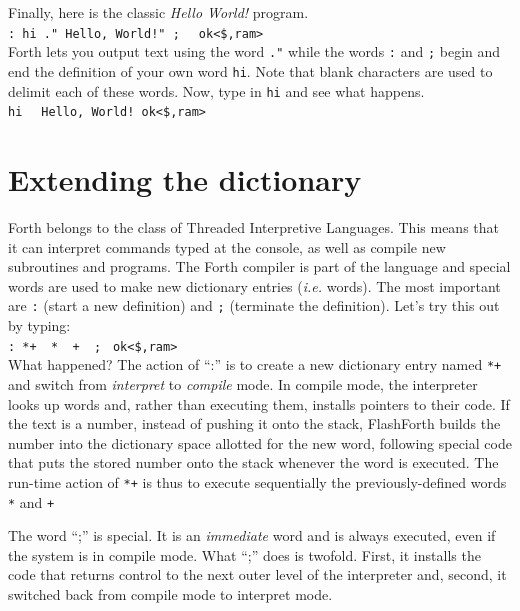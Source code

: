 \documentclass[12pt,a4paper]{article}
\begin{document}
\medskip
Finally, here is the classic \textit{Hello World!} program. \vspace{7pt} \\
\verb?: hi ." Hello, World!" ; ? \fbox{$\hookleftarrow$} \verb! ok<$,ram>! \vspace{7pt} \\
Forth lets you output text using the word \verb!."! while the words \verb!:! and \verb!;!
begin and end the definition of your own word \verb!hi!.
Note that blank characters are used to delimit each of these words.
Now, type in \verb!hi! and see what happens. \vspace{7pt} \\
\verb!hi ! \fbox{$\hookleftarrow$} \verb? Hello, World! ok<$,ram>? \vspace{7pt}


\bigskip
\section{Extending the dictionary}
\label{sec:dictionary}
%
Forth belongs to the class of Threaded Interpretive Languages.
This means that it can interpret commands typed at the console,
as well as compile new subroutines and programs.
The Forth compiler is part of the language and special words are
used to make new dictionary entries (\textit{i.e.} words).
The most important are \verb!:! (start a new definition) and
\verb!;! (terminate the definition).
Let's try this out by typing: \vspace{7pt} \\
\verb!: *+  *  +  ;! \fbox{$\hookleftarrow$} \verb! ok<$,ram>! \vspace{7pt} \\
What happened?
The action of ``:'' is to create a new dictionary entry named \verb!*+! and 
switch from \textit{interpret} to \textit{compile} mode.
In compile mode, the interpreter looks up words and, rather than executing them,
installs pointers to their code.
If the text is a number, instead of pushing it onto the stack, FlashForth builds
the number into the dictionary space allotted for the new word, 
following special code that puts the stored number onto the stack whenever the 
word is executed.
The run-time action of \verb!*+! is thus to execute sequentially the previously-defined words
\verb!*! and \verb!+!

\medskip
The word ``;'' is special.  
It is an \textit{immediate} word and is always executed, even if the system is in compile mode.
What ``;'' does is twofold.
First, it installs the code that returns control to the next outer level of the interpreter and,
second, it switched back from compile mode to interpret mode.
\end{document}

